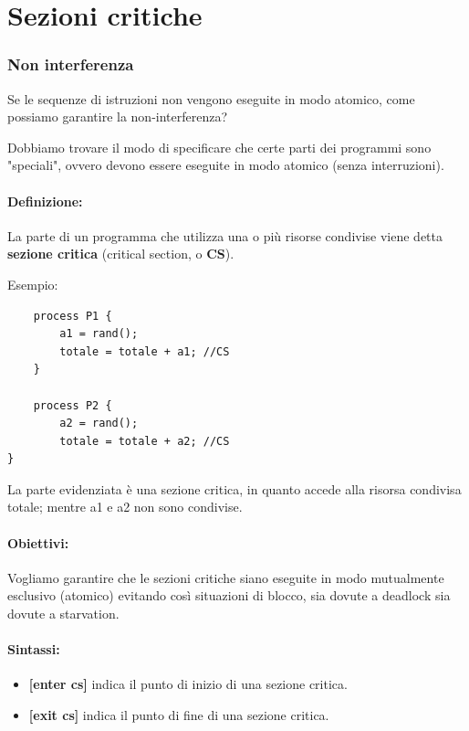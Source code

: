 \section{Sezioni critiche}

\subsubsection{Non interferenza}
Se le sequenze di istruzioni non vengono eseguite in modo atomico,
come possiamo garantire la non-interferenza?

Dobbiamo trovare il modo di specificare che certe parti dei programmi sono "speciali", ovvero devono essere eseguite in modo atomico (senza interruzioni).

\paragraph{Definizione:} La parte di un programma che utilizza una o più risorse condivise viene detta \textbf{sezione critica} (critical section, o \textbf{CS}).
\newline

Esempio:
\begin{lstlisting}
    process P1 {
        a1 = rand();
        totale = totale + a1; //CS
    }

    process P2 {
        a2 = rand();
        totale = totale + a2; //CS
}
\end{lstlisting}

La parte evidenziata è una sezione critica, in quanto accede alla
risorsa condivisa totale; mentre a1 e a2 non sono condivise.

\paragraph{Obiettivi:}Vogliamo garantire che le sezioni critiche siano eseguite in modo
mutualmente esclusivo (atomico) evitando così situazioni di blocco, sia dovute a deadlock sia dovute a starvation.

\paragraph{Sintassi:}
\begin{itemize}
    \item \textbf{[enter cs]} indica il punto di inizio di una sezione critica.
    \item \textbf{[exit cs]} indica il punto di fine di una sezione critica.
\end{itemize}

